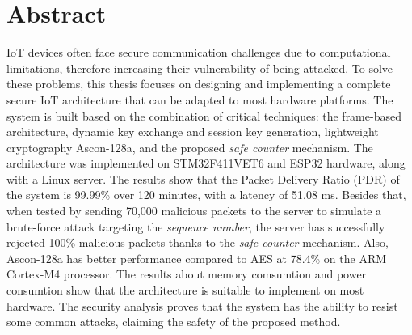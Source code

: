 \chapter*{Abstract}
\label{Abstract-en}

IoT devices often face secure communication challenges due to computational limitations, therefore
increasing their vulnerability of being attacked. To solve these problems, this thesis focuses on 
designing and implementing a complete secure IoT architecture that can be adapted 
to most hardware platforms. The system is built based on the combination of critical techniques: 
the frame-based architecture, dynamic key exchange and session key generation, lightweight cryptography Ascon-128a, 
and the proposed \textit{safe counter} mechanism. The architecture was implemented on STM32F411VET6 and ESP32 hardware, 
along with a Linux server. The results show that the Packet Delivery Ratio (PDR) of the system is 99.99\% over 120 minutes, with
a latency of 51.08 ms. Besides that, when tested by sending 70,000 malicious packets to the server
to simulate a brute-force attack targeting the \textit{sequence number}, the server has successfully rejected 100\% malicious
packets thanks to the \textit{safe counter} mechanism. Also, Ascon-128a has better performance
compared to AES at 78.4\% on the ARM Cortex-M4 processor. The results about memory comsumtion and power consumtion
show that the architecture is suitable to implement on most hardware. The security analysis proves that the system has
the ability to resist some common attacks, claiming the safety of the proposed method. 